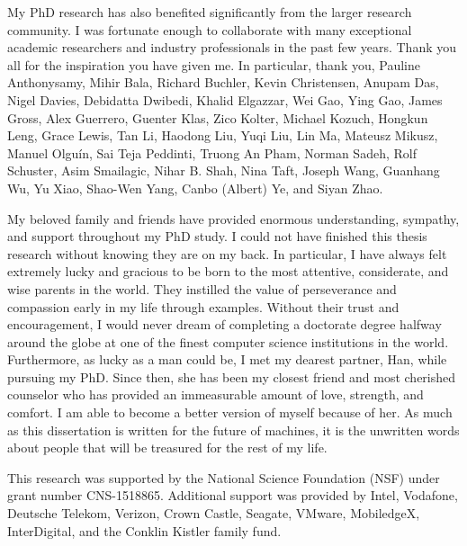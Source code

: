 \begin{acknowledgments}
    My PhD research has also benefited significantly from the larger research
    community. I was fortunate enough to collaborate with many exceptional
    academic researchers and industry professionals in the past few years. Thank
    you all for the inspiration you have given me. In particular, thank you,
    Pauline Anthonysamy, Mihir Bala, Richard Buchler, Kevin Christensen, Anupam
    Das, Nigel Davies, Debidatta Dwibedi, Khalid Elgazzar, Wei Gao, Ying Gao,
    James Gross, Alex Guerrero, Guenter Klas, Zico Kolter, Michael Kozuch,
    Hongkun Leng, Grace Lewis, Tan Li, Haodong Liu, Yuqi Liu, Lin Ma, Mateusz
    Mikusz, Manuel Olguín, Sai Teja Peddinti, Truong An Pham, Norman Sadeh, Rolf
    Schuster, Asim Smailagic, Nihar B. Shah, Nina Taft, Joseph Wang, Guanhang
    Wu, Yu Xiao, Shao-Wen Yang, Canbo (Albert) Ye, and Siyan Zhao.

    My beloved family and friends have provided enormous understanding,
    sympathy, and support throughout my PhD study. I could not have finished
    this thesis research without knowing they are on my back. In particular, I
    have always felt extremely lucky and gracious to be born to the most
    attentive, considerate, and wise parents in the world. They instilled the
    value of perseverance and compassion early in my life through examples.
    Without their trust and encouragement, I would never dream of completing a
    doctorate degree halfway around the globe at one of the finest computer
    science institutions in the world. Furthermore, as lucky as a man could be,
    I met my dearest partner, Han, while pursuing my PhD. Since then, she has
    been my closest friend and most cherished counselor who has provided an
    immeasurable amount of love, strength, and comfort. I am able to become a
    better version of myself because of her. As much as this dissertation is
    written for the future of machines, it is the unwritten words about people
    that will be treasured for the rest of my life.

    \vfill

    This research was supported by the National Science Foundation (NSF) under
    grant number CNS-1518865. Additional support was provided by Intel,
    Vodafone, Deutsche Telekom, Verizon, Crown Castle, Seagate, VMware,
    MobiledgeX, InterDigital, and the Conklin Kistler family fund.

    \clearpage

\end{acknowledgments}

